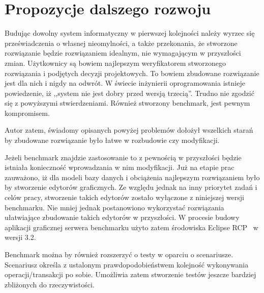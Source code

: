 \section{Propozycje dalszego rozwoju}

Budując dowolny system informatyczny w pierwszej kolejności należy wyrzec się 
przeświadczenia o własnej nieomylności, a także przekonania, że stworzone rozwiązanie
będzie rozwiązaniem idealnym, nie wymagającym w przyszłości zmian. 
Użytkownicy są bowiem najlepszym weryfikatorem stworzonego rozwiązania i podjętych decyzji projektowych.
To bowiem zbudowane rozwiązanie jest dla nich i nigdy na odwrót.
W świecie inżynierii oprogramowania istnieje powiedzenie, iż ,,system nie jest dobry
przed wersją trzecią''. Trudno nie zgodzić się z powyższymi stwierdzeniami. Również
stworzony benchmark, jest pewnym kompromisem. 

Autor zatem, świadomy opisanych powyżej problemów dołożył wszelkich starań by 
zbudowane rozwiązanie było łatwe w rozbudowie czy modyfikacji.

Jeżeli benchmark znajdzie zastosowanie to z pewnością w przyszłości będzie istniała konieczność
wprowadzania w nim modyfikacji. Już na etapie prac zauważono, iż dla modeli
bazy danych i obciążenia najlepszym rozwiązaniem było by stworzenie edytorów graficznych.
Ze względu jednak na inny priorytet zadań i celów pracy, stworzenie takich edytorów 
zostało wyłączone z niniejszej wersji benchmarku. Nie mniej jednak postanowiono
wykorzystać rozwiązania ułatwiające zbudowanie takich edytorów w przyszłości.
W procesie budowy aplikacji graficznej serwera benchmarku użyto zatem środowiska
Eclipse RCP~\cite{RCP1} w wersji 3.2.

Benchmark można by również rozszerzyć o testy w oparciu o scenariusze. Scenariusz określa 
z ustalonym prawdopodobieństwem kolejność wykonywania operacji/transakcji po sobie. Umożliwia zatem
stworzenie testów jeszcze bardziej zbliżonych do rzeczywistości.


